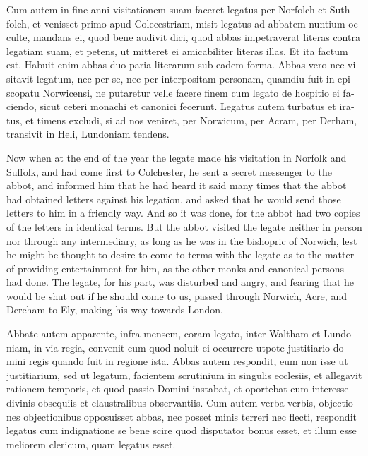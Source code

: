 \documentclass[10pt]{book}
\begin{document}
\begin{paracol}{2}
\switchcolumn*

\begin{otherlanguage}{latin}
Cum autem in fine anni visitationem suam faceret legatus per Norfolch et Suthfolch, et venisset primo apud Colecestriam, misit legatus ad abbatem nuntium occulte, mandans ei, quod bene audivit dici, quod abbas impetraverat literas contra legatiam suam, et petens, ut mitteret ei amicabiliter literas illas. Et ita factum est. Habuit enim abbas duo paria literarum sub eadem forma. Abbas vero nec visitavit legatum, nec per se, nec per interpositam personam, quamdiu fuit in episcopatu Norwicensi, ne putaretur velle facere finem cum legato de hospitio ei faciendo, sicut ceteri monachi et canonici fecerunt. Legatus autem turbatus et iratus, et timens excludi, si ad nos veniret, per Norwicum, per Acram, per Derham, transivit in Heli, Lundoniam tendens. 
\end{otherlanguage}

\switchcolumn

Now when at the end of the year the legate made his visitation in Norfolk and Suffolk, and had come first to Colchester, he sent a secret messenger to the abbot, and informed him that he had heard it said many times that the abbot had obtained letters against his legation, and asked that he would send those letters to him in a friendly way. And so it was done, for the abbot had two copies of the letters in identical terms. But the abbot visited the legate neither in person nor through any intermediary, as long as he was in the bishopric of Norwich, lest he might be thought to desire to come to terms with the legate as to the matter of providing entertainment for him, as the other monks and canonical persons had done. The legate, for his part, was disturbed and angry, and fearing that he would be shut out if he should come to us, passed through Norwich, Acre, and Dereham to Ely, making his way towards London.

\switchcolumn*

\begin{otherlanguage}{latin}
Abbate autem apparente, infra mensem, coram legato, inter Waltham et Lundoniam, in via regia, convenit eum quod noluit ei occurrere utpote justitiario domini regis quando fuit in regione ista. Abbas autem respondit, eum non isse ut justitiarium, sed ut legatum, facientem scrutinium in singulis ecclesiis, et allegavit rationem temporis, et quod passio Domini instabat, et oportebat eum interesse divinis obsequiis et claustralibus observantiis. Cum autem verba verbis, objectiones objectionibus opposuisset abbas, nec posset minis terreri nec flecti, respondit legatus cum indignatione se bene scire quod disputator bonus esset, et illum esse meliorem clericum, quam legatus esset.
\end{otherlanguage}


\end{paracol}
\end{document}
